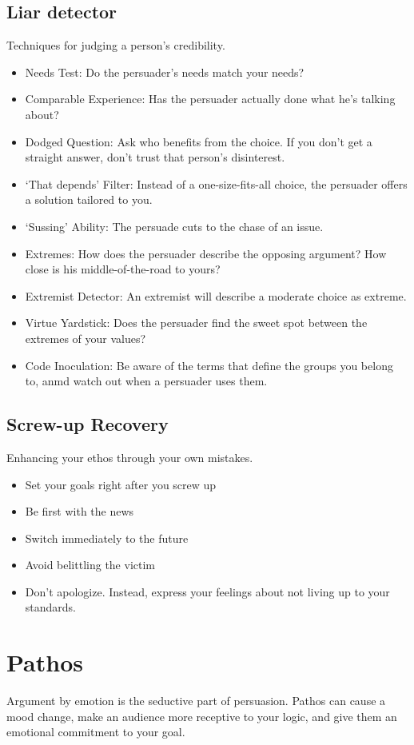 \subsection{Liar detector}
Techniques for judging a person's credibility.
\begin{itemize}
	\item Needs Test: Do the persuader's needs match your needs?
	\item Comparable Experience: Has the persuader actually done what he's talking about?
	\item Dodged Question: Ask who benefits from the choice. If you don't get a straight answer, don't trust that person's disinterest.
	\item `That depends' Filter: Instead of a one-size-fits-all choice, the persuader offers a solution tailored to you.
	\item `Sussing' Ability: The persuade cuts to the chase of an issue.
	\item Extremes: How does the persuader describe the opposing argument? How close is his middle-of-the-road to yours?
	\item Extremist Detector: An extremist will describe a moderate choice as extreme.
	\item Virtue Yardstick: Does the persuader find the sweet spot between the extremes of your values?
	\item Code Inoculation: Be aware of the terms that define the groups you belong to, anmd watch out when a persuader uses them.
\end{itemize}

\subsection{Screw-up Recovery}
Enhancing your ethos through your own mistakes.
\begin{itemize}
	\item Set your goals right after you screw up
	\item Be first with the news
	\item Switch immediately to the future
	\item Avoid belittling the victim
	\item Don't apologize. Instead, express your feelings about not living up to your standards.
\end{itemize}

\section{Pathos}
Argument by emotion is the seductive part of persuasion. Pathos can cause a mood change, make an audience more receptive to your logic, and give them an emotional commitment to your goal.

